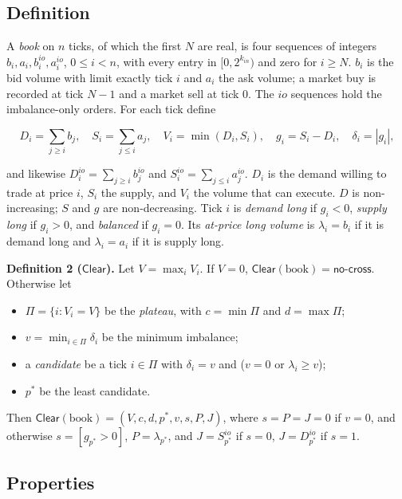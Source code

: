 \subsection{Definition}

A \emph{book} on \(n\) ticks, of which the first \(N\) are real, is four sequences of integers \(b_i, a_i, b^{io}_i, a^{io}_i\), \(0 \le i < n\), with every entry in \([0, 2^{k_{in}})\) and zero for \(i \ge N\). \(b_i\) is the bid volume with limit exactly tick \(i\) and \(a_i\) the ask volume; a market buy is recorded at tick \(N-1\) and a market sell at tick 0. The \(io\) sequences hold the imbalance-only orders. For each tick define

\[
D_i = \sum_{j \ge i} b_j, \quad
S_i = \sum_{j \le i} a_j, \quad
V_i = \min(D_i, S_i), \quad
g_i = S_i - D_i, \quad
\delta_i = |g_i|,
\]

and likewise \(D^{io}_i = \sum_{j \ge i} b^{io}_j\) and \(S^{io}_i = \sum_{j \le i} a^{io}_j\). \(D_i\) is the demand willing to trade at price \(i\), \(S_i\) the supply, and \(V_i\) the volume that can execute. \(D\) is non-increasing; \(S\) and \(g\) are non-decreasing. Tick \(i\) is \emph{demand long} if \(g_i < 0\), \emph{supply long} if \(g_i > 0\), and \emph{balanced} if \(g_i = 0\). Its \emph{at-price long volume} is \(\lambda_i = b_i\) if it is demand long and \(\lambda_i = a_i\) if it is supply long.

\textbf{Definition 2 (\(\mathsf{Clear}\)).} Let \(V = \max_i V_i\). If \(V = 0\), \(\mathsf{Clear}(\text{book}) = \textsf{no-cross}\). Otherwise let

\begin{itemize}
\item
  \(\Pi = \{i : V_i = V\}\) be the \emph{plateau}, with \(c = \min \Pi\) and \(d = \max \Pi\);
\item
  \(v = \min_{i \in \Pi} \delta_i\) be the minimum imbalance;
\item
  a \emph{candidate} be a tick \(i \in \Pi\) with \(\delta_i = v\) and (\(v = 0\) or \(\lambda_i \ge v\));
\item
  \(p^*\) be the least candidate.
\end{itemize}

Then \(\mathsf{Clear}(\text{book}) = (V, c, d, p^*, v, s, P, J)\), where \(s = P = J = 0\) if \(v = 0\), and otherwise \(s = [g_{p^*} > 0]\), \(P = \lambda_{p^*}\), and \(J = S^{io}_{p^*}\) if \(s = 0\), \(J = D^{io}_{p^*}\) if \(s = 1\).

\subsection{Properties}

